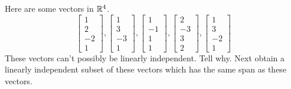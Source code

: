 \documentclass{ximera}
\begin{document}
\begin{problem}\label{prb:3.28} Here are some vectors in $\mathbb{R}^{4}$.
\begin{equation*}
\left[
\begin{array}{r}
1 \\
2 \\
-2 \\
1
\end{array}
\right] ,\left[
\begin{array}{r}
1 \\
3 \\
-3 \\
1
\end{array}
\right] ,\left[
\begin{array}{r}
1 \\
-1 \\
1 \\
1
\end{array}
\right] ,\left[
\begin{array}{r}
2 \\
-3 \\
3 \\
2
\end{array}
\right] ,\left[
\begin{array}{r}
1 \\
3 \\
-2 \\
1
\end{array}
\right]
\end{equation*}
These vectors can't possibly be linearly independent. Tell why. Next obtain a
linearly independent subset of these vectors which has the same span as
these vectors. 
\end{problem}
\end{document}
